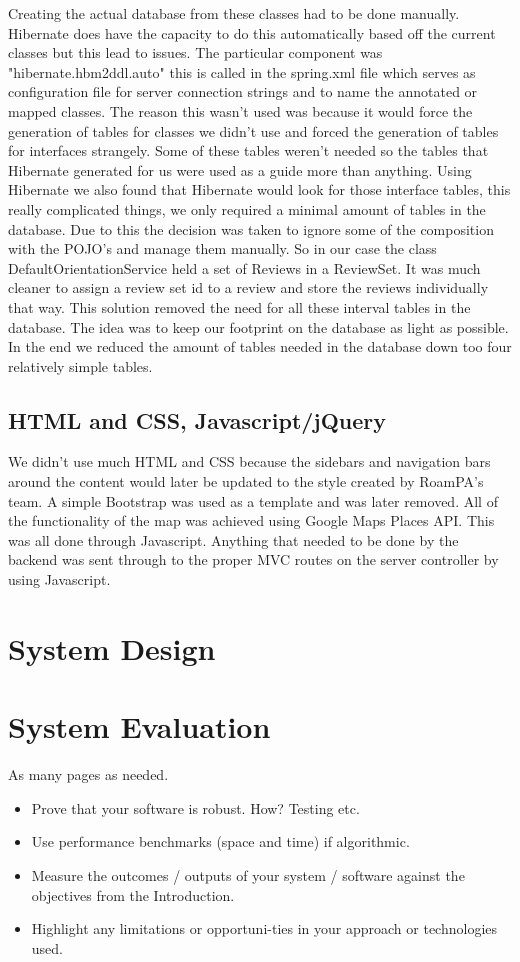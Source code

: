 Creating the actual database from these classes had to be done manually. Hibernate does have the capacity to do this automatically based off the current classes but this lead to issues. The particular component was "hibernate.hbm2ddl.auto" this is called in the spring.xml file which serves as configuration file for server connection strings and to name the annotated or mapped classes. The reason this wasn't used was because it would force the generation of tables for classes we didn't use and forced the generation of tables for interfaces strangely. Some of these tables weren't needed so the tables that Hibernate generated for us were used as a guide more than anything. Using Hibernate we also found that Hibernate would look for those interface tables, this really complicated things, we only required a minimal amount of tables in the database. Due to this the decision was taken to ignore some of the composition with the POJO's and manage them manually. So in our case the class DefaultOrientationService held a set of Reviews in a ReviewSet. It was much cleaner to assign a review set id to a review and store the reviews individually that way. This solution removed the need for all these interval tables in the database. The idea was to keep our footprint on the database as light as possible. In the end we reduced the amount of tables needed in the database down too four relatively simple tables.

\section{HTML and CSS, Javascript/jQuery}

We didn't use much HTML and CSS because the sidebars and navigation bars around the content would later be updated to the style created by RoamPA's team. A simple Bootstrap was used as a template and was later removed. All of the functionality of the map was achieved using Google Maps Places API. This was all done through Javascript. Anything that needed to be done by the backend was sent through to the proper MVC routes on the server controller by using Javascript.

\chapter{System Design}


\chapter{System Evaluation}
As many pages as needed.
\begin{itemize}
\item Prove that your software is robust. How? Testing etc. 
\item Use performance benchmarks (space and time) if algorithmic.
\item Measure the outcomes / outputs of your system / software against the objectives from the Introduction.
\item Highlight any limitations or opportuni-ties in your approach or technologies used.
\end{itemize}

